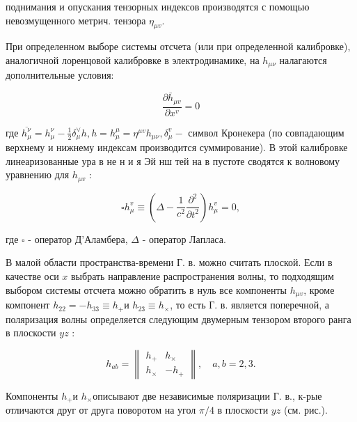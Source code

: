 \documentclass[10pt]{article}
\begin{document}
поднимания и опускания тензорных индексов производятся с помощью невозмущенного метрич. тензора $\eta_{\mu v}$.



При определенном выборе системы отсчета (или при определенной калибровке), аналогичной лоренцовой калибровке в электродинамике, на $h_{\mu \nu}$ налагаются дополнительные условия:



\[

\frac{\partial \bar{h}_{\mu v}}{\partial x^{v}}=0

\]



где $\overline{h_{\mu}^{\nu}}=h_{\mu}^{\nu}-\frac{1}{2} \delta_{\mu}^{\vee} h, h=h_{\mu}^{\mu}=\eta^{\mu v} h_{\mu \nu}, \delta_{\mu}^{v}-$ символ Кронекера (по совпадающим верхнему и нижнему индексам производится суммирование). В этой калибровке линеаризованные ура в не н и я Эй нш тей на в пустоте сводятся к волновому уравнению для $h_{\mu v}$ :



\[

\square h_{\mu}^{v} \equiv\left(\Delta-\frac{1}{c^{2}} \frac{\partial^{2}}{\partial t^{2}}\right) h_{\mu}^{v}=0,

\]



где $\square$ - оператор Д’Аламбера, $\Delta$ - оператор Лапласа.



В малой области пространства-времени Г. в. можно считать плоской. Если в качестве оси $x$ выбрать направление распространения волны, то подходящим выбором системы отсчета можно обратить в нуль все компоненты $h_{\mu v}$, кроме компонент $h_{22}=-h_{33} \equiv h_{+}$и $h_{23} \equiv h_{\times}$, то есть Г. в. является поперечной, а поляризация волны определяется следующим двумерным тензором второго ранга в плоскости $y z$ :



\[

h_{a b}=\left\|\begin{array}{cc}

h_{+} & h_{\times} \\

h_{\times} & -h_{+}

\end{array}\right\|, \quad a, b=2,3 .

\]



Компоненты $h_{+}$и $h_{\times}$описывают две независимые поляризации Г. в., к-рые отличаются друг от друга поворотом на угол $\pi / 4$ в плоскости $y z$ (см. рис.).
\end{document}
